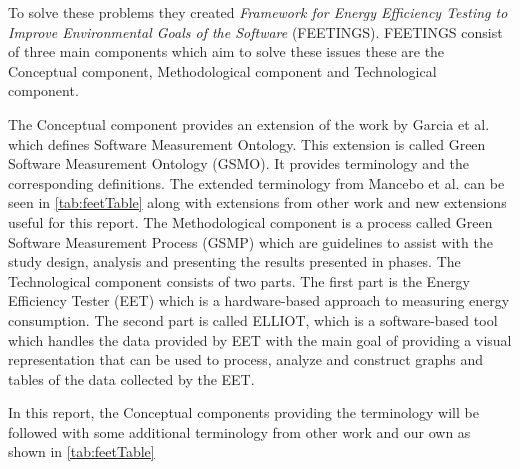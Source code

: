To solve these problems they created \textit{Framework for Energy Efficiency Testing to Improve Environmental Goals of the Software} (FEETINGS). FEETINGS consist of three main components which aim to solve these issues these are the Conceptual component, Methodological component and Technological component.\nytafsnit



The Conceptual component provides an extension of the work by Garcia et al. which defines Software Measurement Ontology\cite{GARCIA2006631}. This extension is called Green Software Measurement Ontology (GSMO). It provides terminology and the corresponding definitions. The extended terminology from Mancebo et al. can be seen in \cref{tab:feetTable} along with extensions from other work and new extensions useful for this report. The Methodological component is a process called Green Software Measurement Process (GSMP) which are guidelines to assist with the study design, analysis and presenting the results presented in phases. The Technological component consists of two parts. The first part is the Energy Efficiency Tester (EET) which is a hardware-based approach to measuring energy consumption. The second part is called ELLIOT, which is a software-based tool which handles the data provided by EET with the main goal of providing a visual representation that can be used to process, analyze and construct graphs and tables of the data collected by the EET.

In this report, the Conceptual components providing the terminology will be followed with some additional terminology from other work and our own as shown in \cref{tab:feetTable}\nytafsnit

